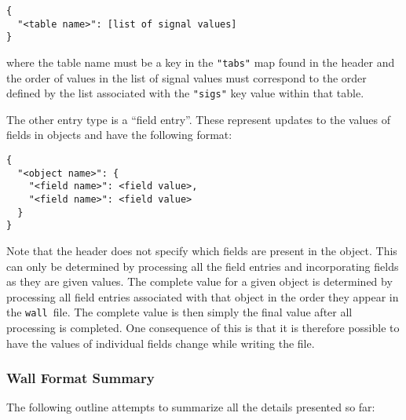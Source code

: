 \documentclass[11pt,a4paper,twocolumn]{article}
\newcommand{\wall}{\texttt{wall}}
\newcommand{\code}[1]{\texttt{#1}} %
\begin{document}
\begin{verbatim}
{
  "<table name>": [list of signal values]
}
\end{verbatim}

where the table name must be a key in the \code{"tabs"} map found in
the header and the order of values in the list of signal values must
correspond to the order defined by the list associated with the
\code{"sigs"} key value within that table.

The other entry type is a ``field entry''.  These represent updates to
the values of fields in objects and have the following format:

\begin{verbatim}
{
  "<object name>": {
    "<field name>": <field value>,
    "<field name>": <field value>
  }
}
\end{verbatim}

Note that the header does not specify which fields are present in the
object.  This can only be determined by processing all the field
entries and incorporating fields as they are given values.  The
complete value for a given object is determined by processing all
field entries associated with that object in the order they appear in
the \wall\ file.  The complete value is then simply the final value
after all processing is completed.  One consequence of this is that it
is therefore possible to have the values of individual fields change
while writing the file.

\subsubsection{Wall Format Summary}


The following outline attempts to summarize all the details presented so
far:
\end{document}
